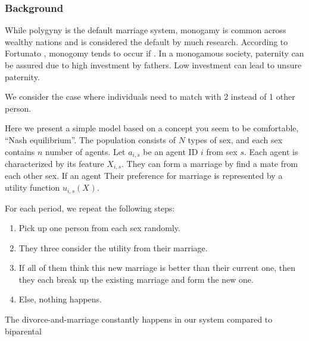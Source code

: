 

\subsubsection{Background}

While polygyny is the default marriage system, monogamy is common across wealthy nations and is considered the default by much research. According to Fortunato \cite{Fortunato2015, Fortunato2009}, monogomy tends to occur if . In a monogamous society, paternity can be assured due to high investment by fathers. Low investment can lead to unsure paternity. 

We consider the case where individuals need to match with 2 instead of 1 other person. 

Here we present a simple model based on a concept you seem to be comfortable, ``Nash equilibrium''. The population consists of $N$ types of sex, and each sex contains $n$ number of agents. Let $a_{i,s}$ be an agent ID $i$ from sex $s$. Each agent is characterized by its feature $X_{i,s}$. They can form a marriage by find a mate from each other sex. If an agent Their preference for marriage is represented by a utility function $u_{i,s}(X_{})$.

For each period, we repeat the following steps:
\begin{enumerate}
    \item Pick up one person from each sex randomly.
    \item They three consider the utility from their marriage.
    \item If {\textit all} of them think this new marriage is better than their current one, then they each break up the existing marriage and form the new one.
    \item Else, nothing happens.
\end{enumerate}





The divorce-and-marriage constantly happens in our system compared to biparental 